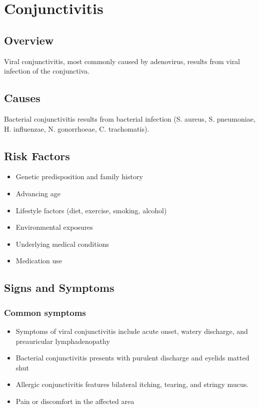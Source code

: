 \chapter{Conjunctivitis}
\label{sec:Conjunctivitis}

\section{Overview}
Viral conjunctivitis, most commonly caused by adenovirus, results from viral infection of the conjunctiva.
\section{Causes}
Bacterial conjunctivitis results from bacterial infection (S. aureus, S. pneumoniae, H. influenzae, N. gonorrhoeae, C. trachomatis).     
\section{Risk Factors}

\begin{itemize}[noitemsep]
  \item Genetic predisposition and family history
  \item Advancing age
  \item Lifestyle factors (diet, exercise, smoking, alcohol)
  \item Environmental exposures
  \item Underlying medical conditions
  \item Medication use
\end{itemize}
\section{Signs and Symptoms}

\subsection{Common symptoms}
\begin{itemize}[noitemsep]
  \item Symptoms of viral conjunctivitis include acute onset, watery discharge, and preauricular lymphadenopathy
  \item Bacterial conjunctivitis presents with purulent discharge and eyelids matted shut
  \item Allergic conjunctivitis features bilateral itching, tearing, and stringy mucus.
  \item Pain or discomfort in the affected area
  \end{itemize}

